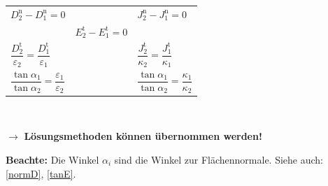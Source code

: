\begin{tabular}{>{\centering}p{}>{\centering}p{}>{\centering\arraybackslash}p{}}
	  \(D_2^\text{n} - D_1^\text{n} = 0 \)                                             &                                                   & \({J}_2^\text{n} - {J}_1^\text{n} = 0 \)                                   \\
	                                                                                   & \(E_2^\text{t} - E_1^\text{t} = 0 \)              &                                                                                    \\
	  \(\dfrac{D_2^\text{t}}{\varepsilon_2} = \dfrac{D_1^\text{t}}{\varepsilon_1} \)   &                                                   & \(\dfrac{J_2^\text{t}}{\kappa_2} = \dfrac{J_1^\text{t}}{\kappa_1} \)               \\
	  \(\dfrac{\tan \alpha_1}{\tan \alpha_2} = \dfrac{\varepsilon_1}{\varepsilon_2} \) &                                                   & \(\dfrac{\tan \alpha_1}{\tan \alpha_2} = \dfrac{\kappa_1}{\kappa_2} \)             \\

  \end{tabular}\\[0.2cm]
  \centerline{$\to$ \textbf{Lösungsmethoden können übernommen werden!}}
  \centerline{\textbf{Beachte:} Die Winkel $\alpha_i$ sind die Winkel zur Flächennormale. Siehe auch: \ref{normD}, \ref{tanE}.}
  